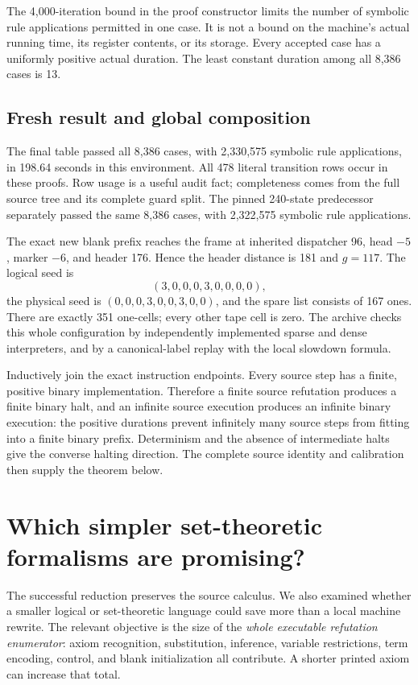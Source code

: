 \documentclass[11pt,a4paper]{article}
\begin{document}
The 4,000-iteration bound in the proof constructor limits the number of
symbolic rule applications permitted in one case. It is not a bound on
the machine's actual running time, its register contents, or its storage.
Every accepted case has a uniformly positive actual duration. The least
constant duration among all 8,386 cases is 13.

\subsection{Fresh result and global composition}

The final table passed all 8,386 cases, with 2,330,575 symbolic rule
applications, in 198.64 seconds in this environment. All 478 literal
transition rows occur in these proofs. Row usage is a useful audit fact;
completeness comes from the full source tree and its complete guard split.
The pinned 240-state predecessor separately passed the same 8,386 cases,
with 2,322,575 symbolic rule applications.

The exact new blank prefix reaches the frame at inherited dispatcher 96,
head $-5$, marker $-6$, and header 176. Hence the header distance is 181
and $g=117$. The logical seed is
\[
(3,0,0,0,3,0,0,0,0),
\]
the physical seed is $(0,0,0,3,0,0,3,0,0)$, and the spare list consists
of 167 ones. There are exactly 351 one-cells; every other tape cell is
zero. The archive checks this whole configuration by independently
implemented sparse and dense interpreters, and by a canonical-label
replay with the local slowdown formula.

Inductively join the exact instruction endpoints. Every source step has
a finite, positive binary implementation. Therefore a finite source
refutation produces a finite binary halt, and an infinite source execution
produces an infinite binary execution: the positive durations prevent
infinitely many source steps from fitting into a finite binary prefix.
Determinism and the absence of intermediate halts give the converse
halting direction. The complete source identity and calibration then
supply the theorem below.



\section{Which simpler set-theoretic formalisms are promising?}

The successful reduction preserves the source calculus. We also examined
whether a smaller logical or set-theoretic language could save more than
a local machine rewrite. The relevant objective is the size of the
\emph{whole executable refutation enumerator}: axiom recognition,
substitution, inference, variable restrictions, term encoding, control,
and blank initialization all contribute. A shorter printed axiom can
increase that total.
\end{document}
